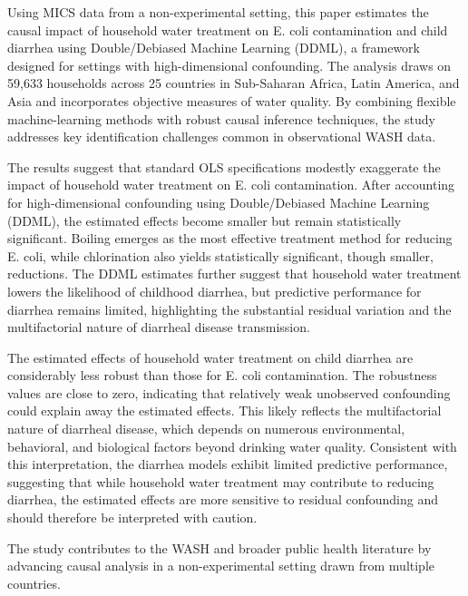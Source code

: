 \documentclass [11pt]{article}
\theoremstyle{plain}
\theoremstyle{definition}
\theoremstyle{remark}
\newcommand{\1}{\bm{1}}
\begin{document}
Using MICS data from a non-experimental setting, this paper estimates the causal impact of household water treatment on E. coli contamination and child diarrhea using Double/Debiased Machine Learning (DDML), a framework designed for settings with high-dimensional confounding. The analysis draws on 59,633 households across 25 countries in Sub-Saharan Africa, Latin America, and Asia and incorporates objective measures of water quality. By combining flexible machine-learning methods with robust causal inference techniques, the study addresses key identification challenges common in observational WASH data.

The results suggest that standard OLS specifications modestly exaggerate the impact of household water treatment on E. coli contamination. After accounting for high-dimensional confounding using Double/Debiased Machine Learning (DDML), the estimated effects become smaller but remain statistically significant. Boiling emerges as the most effective treatment method for reducing E. coli, while chlorination also yields statistically significant, though smaller, reductions. The DDML estimates further suggest that household water treatment lowers the likelihood of childhood diarrhea, but predictive performance for diarrhea remains limited, highlighting the substantial residual variation and the multifactorial nature of diarrheal disease transmission.

The estimated effects of household water treatment on child diarrhea are considerably less robust than those for E. coli contamination. The robustness values are close to zero, indicating that relatively weak unobserved confounding could explain away the estimated effects. This likely reflects the multifactorial nature of diarrheal disease, which depends on numerous environmental, behavioral, and biological factors beyond drinking water quality. Consistent with this interpretation, the diarrhea models exhibit limited predictive performance, suggesting that while household water treatment may contribute to reducing diarrhea, the estimated effects are more sensitive to residual confounding and should therefore be interpreted with caution.

The study contributes to the WASH and broader public health literature by advancing causal analysis in a non-experimental setting drawn from multiple countries.
\end{document}
